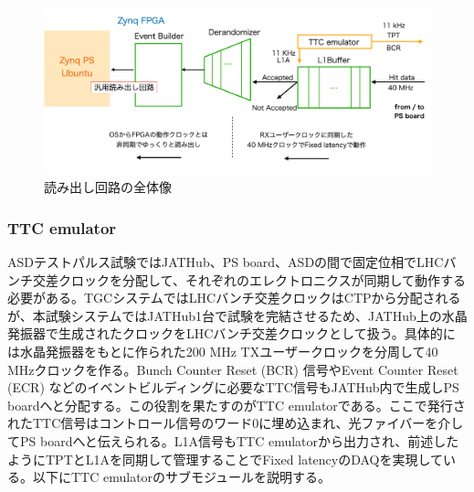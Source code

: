 \begin{figure} 
\centering
\includegraphics[width=16cm]{fig/QAQC/JATHubdaq.png}
\caption[読み出し回路の全体像]{読み出し回路の全体像}
\label{JATHubdaq}
\end{figure}

\subsubsection{TTC emulator} \par
ASDテストパルス試験ではJATHub、PS board、ASDの間で固定位相でLHCバンチ交差クロックを分配して、それぞれのエレクトロニクスが同期して動作する必要がある。TGCシステムではLHCバンチ交差クロックはCTPから分配されるが、本試験システムではJATHub1台で試験を完結させるため、JATHub上の水晶発振器で生成されたクロックをLHCバンチ交差クロックとして扱う。具体的には水晶発振器をもとに作られた200 MHz TXユーザークロックを分周して40 MHzクロックを作る。Bunch Counter Reset (BCR) 信号やEvent Counter Reset (ECR) などのイベントビルディングに必要なTTC信号もJATHub内で生成しPS boardへと分配する。この役割を果たすのがTTC emulatorである。ここで発行されたTTC信号はコントロール信号のワード0に埋め込まれ、光ファイバーを介してPS boardへと伝えられる。L1A信号もTTC emulatorから出力され、前述したようにTPTとL1Aを同期して管理することでFixed latencyのDAQを実現している。以下にTTC emulatorのサブモジュールを説明する。
\baselineskip

